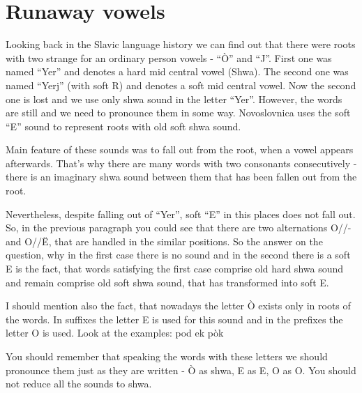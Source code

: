 \section{Runaway vowels}

Looking back in the Slavic language history we can find out that there were roots with two strange for an ordinary person vowels - “Ò” and “J”. First one was named “Yer” and denotes a hard mid central vowel (Shwa). The second one was named “Yerj” (with soft R) and denotes a soft mid central vowel. Now the second one is lost and we use only shwa sound in the letter “Yer”. However, the words are still and we need to pronounce them in some way. Novoslovnica uses the soft “E” sound to represent roots with old soft shwa sound.

Main feature of these sounds was to fall out from the root, when a vowel appears afterwards. That’s why there are many words with two consonants consecutively - there is an imaginary shwa sound between them that has been fallen out from the root.

Nevertheless, despite falling out of “Yer”, soft “E” in this places does not fall out. So, in the previous paragraph you could see that there are two alternations O//- and O//Ë, that are handled in the similar positions. So the answer on the question, why in the first case there is no sound and in the second there is a soft E is the fact, that words satisfying the first case comprise old hard shwa sound and remain comprise old soft shwa sound, that has transformed into soft E.

I should mention also the fact, that nowadays the letter Ò exists only in roots of the words. In suffixes the letter E is used for this sound and in the prefixes the letter O is used. Look at the examples:
pod
ek
pòk  

You should remember that speaking the words with these letters we should pronounce them just as they are written - Ò as shwa, E as E, O as O. You should not reduce all the sounds to shwa. 
